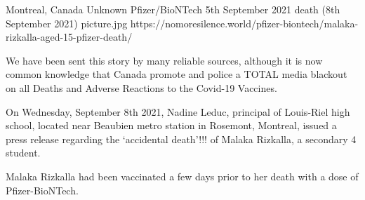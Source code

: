 {Montreal, Canada}
{Unknown}
{Pfizer/BioNTech}
{5th September 2021}
{death (8th September 2021)}
{picture.jpg}
{https://nomoresilence.world/pfizer-biontech/malaka-rizkalla-aged-15-pfizer-death/}
{

We have been sent this story by many reliable sources, although it is now common
knowledge that Canada promote and police a TOTAL media blackout on all Deaths
and Adverse Reactions to the Covid-19 Vaccines.

On Wednesday, September 8th 2021, Nadine Leduc, principal of Louis-Riel high
school, located near Beaubien metro station in Rosemont, Montreal, issued a
press release regarding the ‘accidental death’!!! of Malaka Rizkalla, a
secondary 4 student.

Malaka Rizkalla had been vaccinated a few days prior to her death with a dose of
Pfizer-BioNTech.

}
